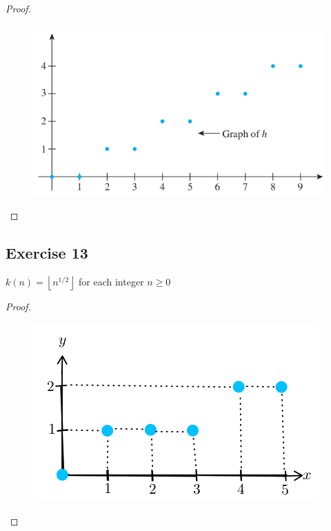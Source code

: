 \documentclass[14pt]{extarticle}
\newcommand{\floor}[1]{{\left\lfloor#1\right\rfloor}}
\begin{document}
\begin{proof}
\begin{figure}[ht!]
\centering
\includegraphics[scale=0.5]{../images/11.1.12.png}
\end{figure}
\end{proof}

\subsection{Exercise 13}
\(k(n) = \floor{n^{1/2}}\) for each integer \(n \geq 0\)

\begin{proof}
\begin{figure}[ht!]
\centering
\includegraphics[scale=0.5]{../images/11.1.13.png}
\end{figure}
\end{proof}
\end{document}
